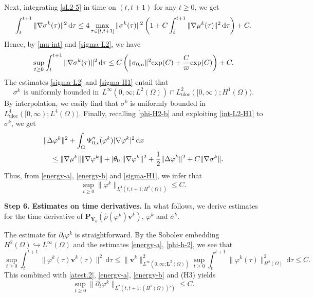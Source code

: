 \documentclass[11pt,reqno]{amsart}
\def\d{{\rm d}}
\newcommand{\uloc}{\operatorname{uloc}}
\def\vv{\bm{v}}
\begin{document}
%
Next, integrating \eqref{sL2-5} in time on $(t,t+1)$ for any $t \geq 0$, we get
\begin{equation}
\int_t^{t+1} \| \nabla \sigma^k(\tau)\|^2 \, \d \tau
\leq 4 \max_{ \tau\in [t,t+1]} \| \sigma^k(\tau)\|^2
\left( 1+C \int_{t}^{t+1} \| \nabla \mu^k(\tau)\|^2 \, \d \tau\right) +C.
\notag
\end{equation}
%
Hence, by \eqref{mu-int} and \eqref{sigma-L2}, we have
%
\begin{equation}
\label{sigma-H1}
\sup_{t \geq 0}
\int_t^{t+1} \| \nabla \sigma^k(\tau)\|^2 \, \d \tau
\leq  C \left( \| \sigma_{0,n}\|^2  {\rm exp} (C) + \frac{C}{\varpi} {\rm exp} (C) \right) +C.
\end{equation}
%
The estimates \eqref{sigma-L2} and \eqref{sigma-H1} entail that
$$
\sigma^k\ \ \text{is uniformly bounded in}\ \ L^\infty(0,\infty; L^2(\Omega))\cap L_{\uloc}^2([0,\infty); H^1(\Omega)).
$$
By interpolation, we easily find that $\sigma^k$ is uniformly bounded in $L^4_{\uloc}([0,\infty);L^4(\Omega))$. Finally, recalling \eqref{phi-H2-b} and exploiting \eqref{int-L2-H1} to $\sigma^k$, we get
\begin{align}
&\| \Delta \varphi^k\|^2 + \int_{\Omega}\Psi_{0,\epsilon}''(\varphi^k)|\nabla \varphi^k|^2 \, \d x
\notag\\
& \quad \leq \|\nabla \mu^k\|\| \nabla \varphi^k\| + |\theta_0| \|\nabla \varphi^k\|^2 + \frac12 \|\Delta\varphi^k\|^2 + C \|\nabla \sigma^k\|.
\label{phi-H2-bb}
\end{align}
Thus, from \eqref{energy-a}, \eqref{energy-b} and \eqref{sigma-H1}, we infer that
\begin{equation}
\label{phi-L4H2}
\sup_{t\geq 0} \| \varphi^k\|_{L^4(t,t+1; H^2(\Omega))}\leq C.
\end{equation}

\textbf{Step 6. Estimates on time derivatives.} In what follows, we derive estimates for the time derivative of $\bm{P}_{\bm{Y}_{k}} (\widehat{\rho}(\varphi^k)\vv^k)$, $\varphi^k$ and $\sigma^k$.

The estimate for $\partial_t\varphi^k$ is straightforward.
By the Sobolev embedding $H^2(\Omega)\hookrightarrow L^\infty(\Omega)$ and the estimates \eqref{energy-a}, \eqref{phi-h-2}, we see that
%
\begin{equation}
\sup _{t\geq 0}\int_t^{t+1} \|  \varphi^{k}(\tau)\bm{v}^{k}(\tau) \|^2\,\mathrm{d}\tau
\leq \|\bm{v}^{k}\|_{L^{\infty}(0,\infty;\bm{L}^2(\Omega))}^2 \sup _{t\geq 0}\int_t^{t+1} \|  \varphi^{k}(\tau)\|_{H^2(\Omega)}^2 \,\mathrm{d}\tau  \le C.
\nonumber
\end{equation}
%
This combined with \eqref{atest.2}, \eqref{energy-a}, \eqref{energy-b} and (H3) yields
\begin{equation}
\sup _{t\geq 0}\|\partial_{t}\varphi^{k}\|_{L^{2}(t,t+1;(H^1(\Omega))')} \le C.
\label{phimt}
\end{equation}
%
\end{document}
